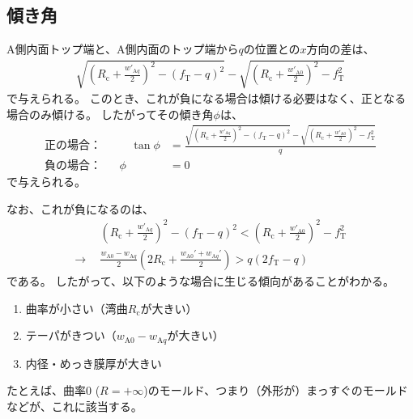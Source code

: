 \subsection{傾き角}
A側内面トップ端と、A側内面のトップ端から$q$の位置との$x$方向の差は、
\begin{align*}
  \sqrt{\left(R_\mathrm c+\frac{w'_{\mathrm Aq}}2\right)^{\!\!2}-(f_\mathrm T-q)^2}
  -\sqrt{\left(R_\mathrm c+\frac{w'_{\mathrm A0}}2\right)^{\!\!2}-f_\mathrm T^2}
\end{align*}
で与えられる。
このとき、これが負になる場合は傾ける必要はなく、正となる場合のみ傾ける。
したがってその傾き角$\phi$は、
\begin{subequations}
\label{eq:dKatamuki}
\begin{alignat}{2}
  \text{正の場合：}&&\quad
  \tan\phi
  &= \frac{\displaystyle
           \sqrt{\left(R_\mathrm c+\frac{w'_{\mathrm Aq}}2\right)^{\!\!2}-(f_\mathrm T-q)^2}
           -\sqrt{\left(R_\mathrm c+\frac{w'_{\mathrm A0}}2\right)^{\!\!2}-f_\mathrm T^2}}q\\[8pt]
  \text{負の場合：}&&
  \phi
  &= 0
\end{alignat}
\end{subequations}
で与えられる。
\begin{hosoku}
なお、これが負になるのは、
\begin{align*}
  & \left(R_\mathrm c+\frac{w'_{\mathrm Aq}}2\right)^{\!\!2}-(f_\mathrm T-q)^2
    < \left(R_\mathrm c+\frac{w'_{\mathrm A0}}2\right)^{\!\!2}-f_\mathrm T^2\\
  \longrightarrow~~
  & \frac{w_{\mathrm A0}-w_{\mathrm Aq}}2
    \left(2R_\mathrm c+\frac{w_{\mathrm A0}'+w_{\mathrm Aq}'}2\right)
    > q(2f_\mathrm T-q)
\end{align*}
である。
したがって、以下のような場合に生じる傾向があることがわかる。
\begin{enumerate}
\item 曲率が小さい（湾曲$R_\mathrm c$が大きい）
\item テーパがきつい（$w_{\mathrm A0}-w_{\mathrm Aq}$が大きい）
\item 内径・めっき膜厚が大きい
\end{enumerate}
たとえば、曲率0 ($R = +\infty$)のモールド、つまり（外形が）まっすぐのモールドなどが、これに該当する。
\end{hosoku}

